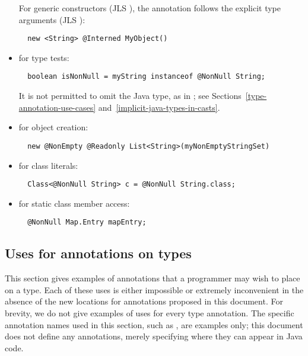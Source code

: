 \documentclass[10pt]{article}
\begin{document}
\begin{itemize}
For generic constructors (JLS ), the
annotation follows the explicit type arguments (JLS
):

\preverbnegspace
\begin{Verbatim}
  new <String> @Interned MyObject()
\end{Verbatim}

\item for type tests:
\preverbnegspace
\begin{Verbatim}
  boolean isNonNull = myString instanceof @NonNull String;
\end{Verbatim}
\preverbnegspace
It is not permitted to omit the Java type, as in
; see
Sections~\ref{type-annotation-use-cases} and~\ref{implicit-java-types-in-casts}.

\item for object creation:
\preverbnegspace
\begin{Verbatim}
  new @NonEmpty @Readonly List<String>(myNonEmptyStringSet)
\end{Verbatim}

\item for class literals:
\preverbnegspace
\begin{Verbatim}
  Class<@NonNull String> c = @NonNull String.class;
\end{Verbatim}


\item for static class member access:
\preverbnegspace
\begin{Verbatim}
  @NonNull Map.Entry mapEntry;
\end{Verbatim}

\end{itemize}


\subsection{Uses for annotations on types\label{type-annotation-use-cases}}

This section gives examples of annotations that a programmer may wish to
place on a type.
Each of these uses is either impossible or extremely inconvenient in the
absence of the new locations for annotations proposed in this document.
For brevity, we do not give examples of uses for every type annotation.
The specific annotation names used in this
section, such as , are examples only; this document does not
define any annotations, merely specifying where they can appear in Java
code.
\end{document}
